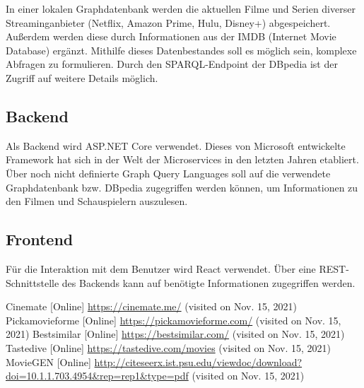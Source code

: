 \documentclass[conference]{IEEEtran}
\begin{document}
In einer lokalen Graphdatenbank werden die aktuellen Filme und Serien diverser Streaminganbieter (Netflix, Amazon Prime, Hulu, Disney+) abgespeichert. Außerdem werden diese durch Informationen aus der IMDB (Internet Movie Database) ergänzt. Mithilfe dieses Datenbestandes soll es möglich sein, komplexe Abfragen zu formulieren. Durch den SPARQL-Endpoint der DBpedia ist der Zugriff auf weitere Details möglich.

\subsection*{Backend}

Als Backend wird ASP.NET Core verwendet. Dieses von Microsoft entwickelte Framework hat sich in der Welt der Microservices in den letzten Jahren etabliert. Über noch nicht definierte Graph Query Languages soll auf die verwendete Graphdatenbank bzw. DBpedia zugegriffen werden können, um Informationen zu den Filmen und Schauspielern auszulesen.

\subsection*{Frontend}

Für die Interaktion mit dem Benutzer wird React verwendet. Über eine REST-Schnittstelle des Backends kann auf benötigte Informationen zugegriffen werden.


\begin{thebibliography}{0}
	Cinemate [Online] \url{https://cinemate.me/} (visited on Nov. 15, 2021)
	Pickamovieforme [Online] \url{https://pickamovieforme.com/} (visited on Nov. 15, 2021)
	Bestsimilar [Online] \url{https://bestsimilar.com/} (visited on Nov. 15, 2021)
	Tastedive [Online] \url{https://tastedive.com/movies} (visited on Nov. 15, 2021)
	MovieGEN [Online] \url{http://citeseerx.ist.psu.edu/viewdoc/download?doi=10.1.1.703.4954\&rep=rep1\&type=pdf} (visited on Nov. 15, 2021)
\end{thebibliography}
\vspace{12pt}
\end{document}
